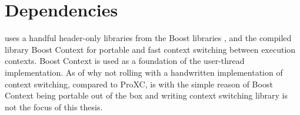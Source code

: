 \section{Dependencies}
\label{sec:dependencies}


\Proxc{} uses a handful header\hyp{}only libraries from the Boost \Cpp{} libraries \citep{boost2017boost}, and the compiled library Boost Context \citep{kowalke2017boost} for portable and fast context switching between execution contexts. Boost Context is used as a foundation of the user\hyp{}thread implementation. As of why not rolling with a handwritten implementation of context switching, compared to ProXC, is with the simple reason of Boost Context being portable out of the box and writing context switching library is not the focus of this thesis.

